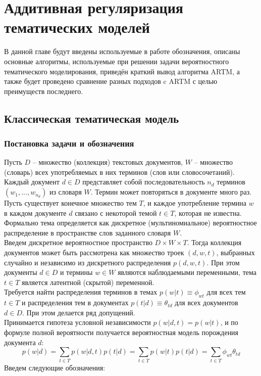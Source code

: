 \documentclass[12pt]{article}
\begin{document}
	\section{Аддитивная регуляризация тематических моделей}
В данной главе будут введены используемые в работе обозначения, описаны основные алгоритмы, используемые при решении задачи вероятностного тематического моделирования, приведён краткий вывод алгоритма ARTM, а также будет проведено сравнение разных подходов c ARTM с целью преимуществ последнего.
	\subsection{Классическая тематическая модель}
\subsubsection{Постановка задачи и обозначения}
\label{subsec:denotes}
Пусть $D$ -- множество (коллекция) текстовых документов, $W$ -- множество (словарь) всех употребляемых в них терминов (слов или словосочетаний). Каждый документ $d \in D$ представляет собой последовательность $n_d$ терминов $(w_1, . . . , w_{n_d})$ из словаря $W$. Термин может повторяться в документе много раз.
Пусть существует конечное множество тем $T$, и каждое употребление термина $w$ в каждом документе $d$ связано с некоторой темой $t \in T$, которая не известна. Формально тема определяется как дискретное (мультиномиальное) вероятностное распределение в пространстве слов заданного словаря $W$.\\
Введем дискретное вероятностное пространство $D \times W \times T$. Тогда коллекция документов может быть рассмотрена как множество троек $(d, w, t)$, выбранных случайно и независимо из дискретного распределения $p(d, w, t)$. При этом документы $d \in D$ и термины $w \in W$ являются наблюдаемыми переменными, тема $t \in T$ является латентной (скрытой) переменной.\\
Требуется найти распределения терминов в темах $p(w|t) \equiv \phi_{wt}$ для всех тем $t \in T$ и распределения тем в документах $p(t|d) \equiv \theta_{td}$ для всех документов $d \in D$. При этом делается ряд допущений.\\
Принимается гипотеза условной независимости $p(w|d,t) = p(w|t)$, и  по формуле полной вероятности получается вероятностная модель порождения документа $d$:
\[
p(w|d) = \sum_{t \in T} p(w|d,t)p(t|d) = \sum_{t \in T}p(w|t)p(t|d)=\sum_{t \in T}\phi_{wt}\theta_{td}
\]
Введем следующие обозначения:
\end{document}
